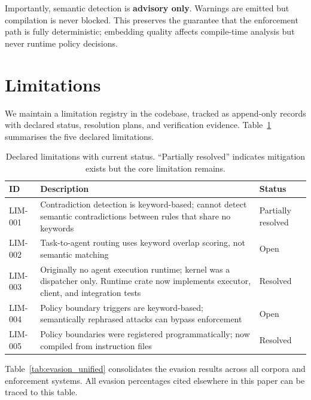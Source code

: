 \documentclass[11pt,a4paper]{article}
\begin{document}
Importantly, semantic detection is \textbf{advisory only}. Warnings are
emitted but compilation is never blocked. This preserves the guarantee
that the enforcement path is fully deterministic; embedding quality
affects compile-time analysis but never runtime policy decisions.

\section{Limitations}
\label{sec:limitations}

We maintain a limitation registry in the codebase, tracked as
append-only records with declared status, resolution plans, and
verification evidence. Table~\ref{tab:limitations} summarises the five
declared limitations.

\begin{table}[ht]
\centering
\caption{Declared limitations with current status. ``Partially resolved''
  indicates mitigation exists but the core limitation remains.}
\label{tab:limitations}
\small
\begin{tabular}{lp{6cm}l}
\toprule
\textbf{ID} & \textbf{Description} & \textbf{Status} \\
\midrule
LIM-001 & Contradiction detection is keyword-based; cannot detect
  semantic contradictions between rules that share no keywords &
  Partially resolved \\
LIM-002 & Task-to-agent routing uses keyword overlap scoring, not
  semantic matching & Open \\
LIM-003 & Originally no agent execution runtime; kernel was a dispatcher
  only. Runtime crate now implements executor, client, and
  integration tests & Resolved \\
LIM-004 & Policy boundary triggers are keyword-based; semantically
  rephrased attacks can bypass enforcement & Open \\
LIM-005 & Policy boundaries were registered programmatically; now
  compiled from instruction files & Resolved \\
\bottomrule
\end{tabular}
\end{table}

Table~\ref{tab:evasion_unified} consolidates the evasion results across
all corpora and enforcement systems. All evasion percentages cited
elsewhere in this paper can be traced to this table.
\end{document}
